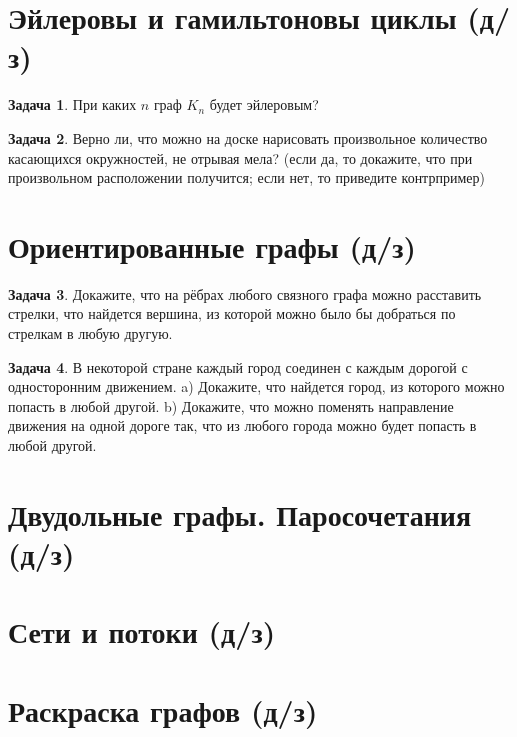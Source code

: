 \documentclass[12pt,a4paper,fleqn]{article}
\theoremstyle{definition}
\newtheorem{exersize}{Задача}[section]
\begin{document}
\newpage
\section{Эйлеровы и гамильтоновы циклы (д/з)}
\begin{exersize}
	При каких $n$ граф $K_n$ будет эйлеровым?
\end{exersize}
\begin{exersize}
	Верно ли, что можно на доске нарисовать произвольное количество касающихся окружностей, не отрывая мела? (если да, то докажите, что при произвольном расположении получится; если нет, то приведите контрпример)
\end{exersize}

\newpage
\section{Ориентированные графы (д/з)}
\begin{exersize}
	Докажите, что на рёбрах любого связного графа можно расставить стрелки, что найдется вершина, из которой можно было бы добраться по стрелкам в любую другую.
\end{exersize}
\begin{exersize}
	 В некоторой стране каждый город соединен с каждым дорогой с односторонним движением. a) Докажите, что найдется город, из которого можно попасть в любой другой. b) Докажите, что можно поменять направление движения на одной дороге так, что из любого города можно будет попасть в любой другой.
\end{exersize}

\newpage
\section{Двудольные графы. Паросочетания (д/з)}

\newpage
\section{Сети и потоки (д/з)}

\newpage
\section{Раскраска графов (д/з)}
\end{document}
